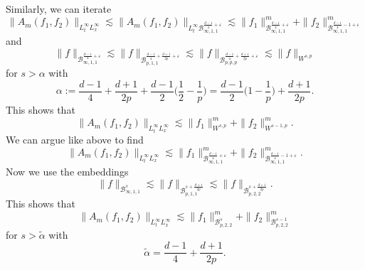 \documentclass{amsart}
\theoremstyle{definition}
\numberwithin{equation}{section}
\begin{document}
Similarly, we can iterate
\begin{equation*}
\| A_m(f_1,f_2) \|_{L_t^\infty L_x^\infty} \lesssim \| A_m (f_1,f_2) \|_{L_t^\infty \mathcal{B}^{\frac{d-1}{4}+\varepsilon}_{\infty,1,1}} \lesssim \| f_1 \|^m_{\mathcal{B}^{\frac{d-1}{4}+\varepsilon}_{\infty,1,1}} + \|f_2 \|^m_{\mathcal{B}^{\frac{d-1}{4}-1+\varepsilon}_{\infty,1,1}}
\end{equation*}
and
\begin{equation*}
\| f \|_{\mathcal{B}^{\frac{d-1}{4}+\varepsilon}_{\infty,1,1}} \lesssim \| f \|_{\mathcal{B}^{\frac{d-1}{4}+\frac{d+1}{2p}+\varepsilon}_{p,1,1}} \lesssim \| f \|_{\mathcal{B}^{\frac{d-1}{4}+\frac{d+1}{2p}+\varepsilon}_{p,p,p}} \lesssim \| f \|_{W^{s,p}}
\end{equation*}
for $s > \alpha$ with
\begin{equation}
\label{eq:RegularityLpSpaces}
\alpha := \frac{d-1}{4}+\frac{d+1}{2p} + \frac{d-1}{2} \big( \frac{1}{2} - \frac{1}{p} \big) = \frac{d-1}{2} \big( 1 - \frac{1}{p} \big) + \frac{d+1}{2p}.
\end{equation}
This shows that
\begin{equation*}
\| A_m(f_1,f_2) \|_{L_t^\infty L_x^\infty} \lesssim \| f_1 \|^m_{W^{s,p}} + \| f_2 \|^m_{W^{s-1,p}}.
\end{equation*}
We can argue like above to find
\begin{equation*}
\| A_m(f_1,f_2) \|_{L_t^\infty L_x^\infty} \lesssim \| f_1 \|^m_{\mathcal{B}^{\frac{d-1}{4}+\varepsilon}_{\infty,1,1}} + \|f_2 \|^m_{\mathcal{B}^{\frac{d-1}{4}-1+\varepsilon}_{\infty,1,1}}.
\end{equation*}
Now we use the embeddings
\begin{equation*}
\| f \|_{\mathcal{B}^{s}_{\infty,1,1}} \lesssim \| f \|_{\mathcal{B}^{s+\frac{d+1}{2p}}_{p,1,1}} \lesssim \| f \|_{\mathcal{B}^{s+\frac{d+1}{2p}}_{p,2,2}}.
\end{equation*}
This shows that 
\begin{equation*}
\| A_m(f_1,f_2) \|_{L_t^\infty L_x^\infty} \lesssim \| f_1 \|^m_{\mathcal{B}^{s}_{p,2,2}} + \| f_2 \|^m_{\mathcal{B}^{s-1}_{p,2,2}}
\end{equation*}
for $s> \tilde{\alpha}$ with
\begin{equation}
\label{eq:RegularityAdaptedSpaces}
\tilde{\alpha} = \frac{d-1}{4} + \frac{d+1}{2p}.
\end{equation}
\end{document}
